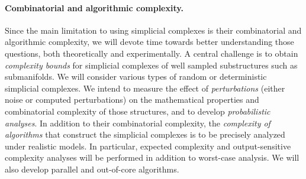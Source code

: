\paragraph{Combinatorial and algorithmic complexity.}

Since the main limitation to using simplicial complexes is their combinatorial and algorithmic complexity, we will devote time towards better understanding those questions, both theoretically and experimentally.  %
A central challenge is to obtain {\em complexity bounds} for simplicial complexes of well sampled substructures such as submanifolds. We will consider various types of random or deterministic simplicial complexes.  We intend to measure the effect of {\em perturbations} (either noise or computed perturbations) on the mathematical properties and combinatorial complexity of those structures, and to develop {\em probabilistic analyses}.  In addition to their combinatorial complexity, the {\em complexity of algorithms} that construct the simplicial complexes is to be precisely analyzed under realistic models. In particular, expected complexity and output-sensitive complexity analyses will be performed in addition to worst-case analysis. %
We will also develop parallel and out-of-core algorithms.%


